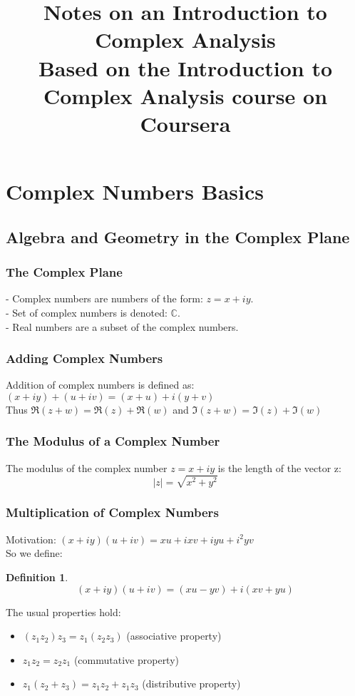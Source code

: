 \documentclass{article}
\title{Notes on an Introduction to Complex Analysis\\
	\normalsize Based on the Introduction to Complex Analysis course on Coursera}
\newtheorem{definition}{Definition}[section]
\begin{document}
\maketitle
\newpage
\tableofcontents
\newpage
\section{Complex Numbers Basics}

\subsection{Algebra and Geometry in the Complex Plane}

\subsubsection{The Complex Plane}
- Complex numbers are numbers of the form: $z = x + iy$. \\
- Set of complex numbers is denoted: $\mathbb{C}$. \\
- Real numbers are a subset of the complex numbers.

\subsubsection{Adding Complex Numbers}
Addition of complex numbers is defined as: $(x + iy) + (u+ iv) = (x + u) + i(y + v)$ \\
Thus $\Re(z + w) = \Re(z) + \Re(w)$ and $\Im(z + w) = \Im(z) + \Im(w)$

\subsubsection{The Modulus of a Complex Number}
The modulus of the complex number $z = x + iy$ is the length of the vector z:
\begin{equation*}
\left|z\right| = \sqrt{x^2 + y^2}
\end{equation*}

\subsubsection{Multiplication of Complex Numbers}
Motivation: $(x + iy)(u + iv) = xu + ixv + iyu + i^2yv$ \\
So we define:
\begin{definition}
\begin{equation*}
(x + iy)(u + iv) = (xu - yv) + i(xv + yu)
\end{equation*}
\end{definition}
The usual properties hold:
\begin{itemize}
\item $(z_1z_2)z_3 = z_1(z_2z_3)$ (associative property)
\item $z_1z_2 = z_2z_1$ (commutative property)
\item $z_1(z_2 + z_3) = z_1z_2 + z_1z_3$ (distributive property)
\end{itemize}
\end{document}
